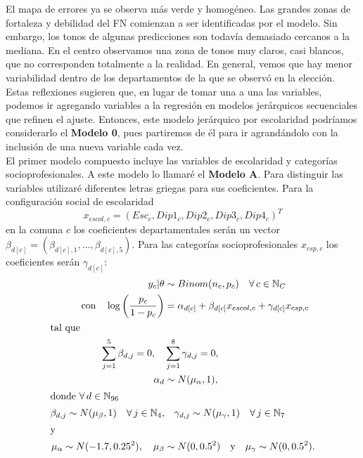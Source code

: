 El mapa de errores ya se observa más verde y homogéneo. Las grandes zonas de fortaleza y debilidad del FN comienzan a ser identificadas por el modelo. Sin embargo, los tonos de algunas predicciones son todavía demasiado cercanos a la mediana. En el centro observamos una zona de tonos muy claros, casi blancos, que no corresponden totalmente a la realidad. En general, vemos que hay menor variabilidad dentro de los departamentos de la que se observó en la elección.\\ 

Estas reflexiones sugieren que, en lugar de tomar una a una las variables, podemos ir agregando variables a la regresión en modelos jerárquicos secuenciales que refinen el ajuste. Entonces, este modelo jerárquico por escolaridad podríamos considerarlo el \textbf{Modelo 0}, pues partiremos de él para ir agrandándolo con la inclusión de una nueva variable cada vez.\\ 

El primer modelo compuesto incluye las variables de escolaridad y categorías socioprofesionales. A este modelo lo llamaré el \textbf{Modelo A}. Para distinguir las variables utilizaré diferentes letras griegas para sus coeficientes. Para la configuración social de escolaridad 
\[x_{escol,c} = (Esc_c,Dip1_c,Dip2_c,Dip3_c,Dip4_c)^T\]
en la comuna $c$ los coeficientes departamentales serán un vector $\beta_{d[c]} = (\beta_{d[c],1},\dots,\beta_{d[c],5})$. Para las categorías socioprofesionales $x_{csp,c}$ los coeficientes serán $\gamma_{d[c]}$:
\begin{align}\label{eq:Modelo_Comp_A}
y_c|\theta & \sim Binom(n_c,p_c) \quad \forall \, c \in \mathbb{N}_C \nonumber \\
\text{con} \quad \log\left(\dfrac{p_c}{1-p_c}\right) &= \alpha_{d[c]} + \beta_{d[c]} x_{escol,c} + \gamma_{d[c]} x_{csp,c} \\ 
\shortintertext{tal que} 
\sum\limits_{j = 1}^{5} \beta_{d,j}=0, \quad & \sum\limits_{j = 1}^{8} \gamma_{d,j}=0, \nonumber \\
\alpha_d & \sim N(\mu_{\alpha}, 1), \nonumber \\
\shortintertext{donde $\forall \, d \in \mathbb{N}_{96}$}
\beta_{d,j} \sim N(\mu_{\beta}, 1) \quad \forall \, j \in \mathbb{N}_{4}, & \quad \gamma_{d,j} \sim N(\mu_{\gamma}, 1) \quad \forall \, j \in \mathbb{N}_{7} \nonumber \\
\shortintertext{y}
\mu_{\alpha} \sim N(-1.7, 0.25^2), \quad \mu_{\beta} &\sim N(0, 0.5^2) \quad \text{y} \quad \mu_{\gamma} \sim N(0,0.5^2). \nonumber
\end{align}

